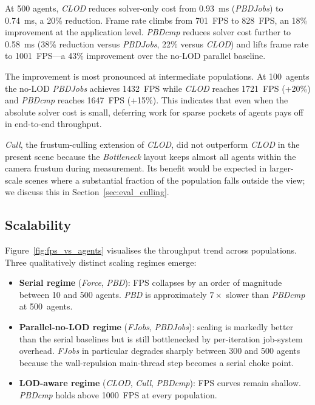 At 500 agents, \textit{CLOD} reduces solver-only cost from 0.93~ms
(\textit{PBDJobs}) to 0.74~ms, a 20\% reduction.  Frame rate climbs
from 701~FPS to 828~FPS, an 18\% improvement at the application level.
\textit{PBDcmp} reduces solver cost further to 0.58~ms (38\% reduction
versus \textit{PBDJobs}, 22\% versus \textit{CLOD}) and lifts frame
rate to 1001~FPS---a 43\% improvement over the no-LOD parallel
baseline.

The improvement is most pronounced at intermediate populations.
At 100~agents the no-LOD \textit{PBDJobs} achieves 1432~FPS while
\textit{CLOD} reaches 1721~FPS (+20\%) and \textit{PBDcmp} reaches
1647~FPS (+15\%).  This indicates that even when the absolute solver
cost is small, deferring work for sparse pockets of agents pays off in
end-to-end throughput.

\textit{Cull}, the frustum-culling extension of \textit{CLOD}, did not
outperform \textit{CLOD} in the present scene because the
\textit{Bottleneck} layout keeps almost all agents within the camera
frustum during measurement.  Its benefit would be expected in
larger-scale scenes where a substantial fraction of the population
falls outside the view; we discuss this in
Section~\ref{sec:eval_culling}.

\subsection{Scalability}
\label{sec:results_scalability}

Figure~\ref{fig:fps_vs_agents} visualises the throughput trend across
populations.  Three qualitatively distinct scaling regimes emerge:

\begin{itemize}[topsep=2pt,itemsep=2pt]
    \item \textbf{Serial regime} (\textit{Force}, \textit{PBD}): FPS
    collapses by an order of magnitude between 10 and 500 agents.
    \textit{PBD} is approximately $7\times$ slower than \textit{PBDcmp}
    at 500~agents.
    \item \textbf{Parallel-no-LOD regime} (\textit{FJobs},
    \textit{PBDJobs}): scaling is markedly better than the serial
    baselines but is still bottlenecked by per-iteration job-system
    overhead.  \textit{FJobs} in particular degrades sharply between
    300 and 500 agents because the wall-repulsion main-thread step
    becomes a serial choke point.
    \item \textbf{LOD-aware regime} (\textit{CLOD}, \textit{Cull},
    \textit{PBDcmp}): FPS curves remain shallow.  \textit{PBDcmp}
    holds above 1000~FPS at every population.
\end{itemize}


